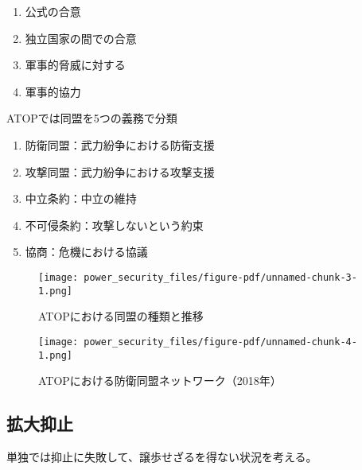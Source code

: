 \documentclass[
  xelatex,
  ja=standard]{bxjsarticle}
\providecommand{\tightlist}{%
  \setlength{\itemsep}{0pt}\setlength{\parskip}{0pt}}\usepackage{longtable,booktabs,array}
\begin{document}
\begin{enumerate}
\def\labelenumi{\arabic{enumi}.}
\tightlist
\item
  公式の合意
\item
  独立国家の間での合意
\item
  軍事的脅威に対する
\item
  軍事的協力
\end{enumerate}

ATOPでは同盟を5つの義務で分類

\begin{enumerate}
\def\labelenumi{\arabic{enumi}.}
\tightlist
\item
  防衛同盟：武力紛争における防衛支援
\item
  攻撃同盟：武力紛争における攻撃支援
\item
  中立条約：中立の維持
\item
  不可侵条約：攻撃しないという約束
\item
  協商：危機における協議
\end{enumerate}

\begin{figure}[htpb]

{\centering \texttt{[image: power\_security\_files/figure-pdf/unnamed-chunk-3-1.png]}

}

\caption{ATOPにおける同盟の種類と推移}

\end{figure}

\begin{figure}[htpb]

{\centering \texttt{[image: power\_security\_files/figure-pdf/unnamed-chunk-4-1.png]}

}

\caption{ATOPにおける防衛同盟ネットワーク（2018年）}

\end{figure}

\hypertarget{ux62e1ux5927ux6291ux6b62}{%
\subsection{拡大抑止}\label{ux62e1ux5927ux6291ux6b62}}

単独では抑止に失敗して、譲歩せざるを得ない状況を考える。
\end{document}
